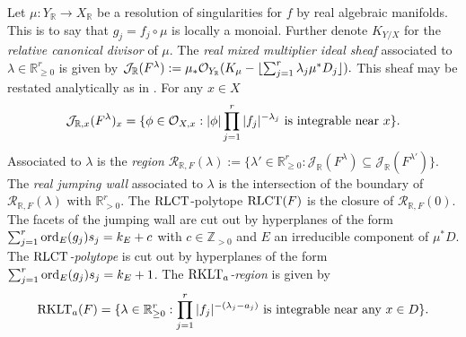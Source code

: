 Let $\mu:Y_\mathbb{R}\to X_\mathbb{R}$ be a resolution of singularities for $f$ by real algebraic manifolds.
This is to say that $g_j = f_j\circ \mu$ is locally a monoial.
Further denote $K_{Y/X}$ for the {\it relative canonical divisor} of $\mu$.
The {\it real mixed multiplier ideal sheaf} associated to $\lambda \in \mathbb{R}_{\geq 0}^r$ is given by
$\mathcal{J}_{\mathbb{R}}(F^\lambda) := \mu_* \mathcal{O}_{Y_\mathbb{R}}(K_\mu - \lfloor \sum_{j=1}^r \lambda_j \mu^* D_j \rfloor). $
This sheaf may be restated analytically as in \cite[Proposition 1]{RealLogCan}.
For any $x\in X$
$$\mathcal{J}_{\mathbb{R},x}(F^\lambda)_x =\{\phi\in \mathcal{O}_{X,x} :  \vert \phi \vert\prod_{j=1}^r \vert f_j \vert^{-\lambda_j} \text{ is integrable near }x\}.$$
Associated to $\lambda$ is the {\it region} $\mathcal{R}_{\mathbb{R},F}(\lambda) := \{\lambda' \in \mathbb{R}_{\geq 0}^r : \mathcal{J}_\mathbb{R}(F^\lambda) \subseteq \mathcal{J}_\mathbb{R}(F^{\lambda'})\}.$
The {\it real jumping wall} associated to $\lambda$ is the intersection of the boundary of $\mathcal{R}_{\mathbb{R},F}(\lambda)$ with $\mathbb{R}_{>0}^r$. The $\operatorname{RLCT}$-polytope $\operatorname{RLCT}(F)$ is the closure of $\mathcal{R}_{\mathbb{R},F}(0)$.
The facets of the jumping wall are cut out by hyperplanes of the form $\sum_{j=1}^r\operatorname{ord}_E(g_j)s_j = k_E + c$ with $c\in \mathbb{Z}_{>0}$ and $E$ an irreducible component of $\mu^*D$.
The {\it $\operatorname{RLCT}$-polytope} is cut out by hyperplanes of the form $\sum_{j=1}^r\operatorname{ord}_E(g_j)s_j = k_E + 1$.
The {\it $\operatorname{RKLT}_a$-region} is given by
$$\operatorname{RKLT}_a(F) = \{\lambda\in \mathbb{R}_{\geq 0}^r : \prod_{j=1}^r \vert f_j \vert^{-(\lambda_j-a_j)}\text{ is integrable near any }x\in D\}.$$

